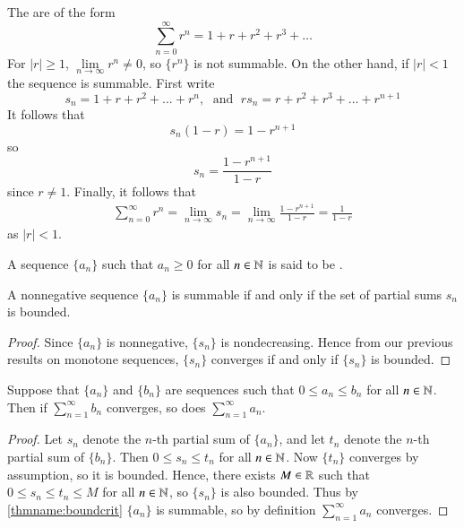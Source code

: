 \documentclass[12pt, a4paper, oneside, openright, titlepage]{book}
\begin{document}
\begin{eg}
    The  are of the form \begin{equation*}
        \sum\limits_{n=0}^{\infty}r^n = 1+r+r^2+r^3+\hdots
    \end{equation*}
    For $|r| \geq 1$, $\lim\limits_{n\rightarrow \infty}r^n \neq 0$, so $\{r^n\}$ is not summable. On the other hand, if $|r| < 1$ the sequence is summable. First write $$s_n = 1+r+r^2+...+r^n,\;\text{ and }\;rs_n = r+r^2+r^3+...+r^{n+1}$$
    It follows that $$s_n(1-r) = 1 - r^{n+1}$$ so $$s_n = \frac{1-r^{n+1}}{1-r}$$ since $r \neq 1$. Finally, it follows that \begin{align*}
        \sum\limits_{n=0}^{\infty}r^n = \lim\limits_{n\rightarrow \infty}s_n = \lim\limits_{n\rightarrow \infty}\frac{1-r^{n+1}}{1-r} = \frac{1}{1-r}
    \end{align*}
    as $|r| < 1$.
\end{eg}

\begin{defn}
    A sequence $\{a_n\}$ such that $a_n\geq 0$ for all $n \in \mathbb N$ is said to be .
\end{defn}

\begin{namthm}\label{thmname:boundcrit}
    A nonnegative sequence $\{a_n\}$ is summable if and only if the set of partial sums $s_n$ is bounded.
\end{namthm}
\begin{proof}
    Since $\{a_n\}$ is nonnegative, $\{s_n\}$ is nondecreasing. Hence from our previous results on monotone sequences, $\{s_n\}$ converges if and only if $\{s_n\}$ is bounded.
\end{proof}


\begin{namthm}\label{thmname:comptest}
    Suppose that $\{a_n\}$ and $\{b_n\}$ are sequences such that $0 \leq a_n \leq b_n$ for all $n \in \mathbb N$. Then if $\sum\limits_{n=1}^{\infty}b_n$ converges, so does $\sum\limits_{n=1}^{\infty}a_n$.
\end{namthm}
\begin{proof}
    Let $s_n$ denote the $n$-th partial sum of $\{a_n\}$, and let $t_n$ denote the $n$-th partial sum of $\{b_n\}$. Then $0 \leq s_n \leq t_n$ for all $n \in \mathbb N$. Now $\{t_n\}$ converges by assumption, so it is bounded. Hence, there exists $M \in \mathbb R$ such that $0 \leq s_n \leq t_n \leq M$ for all $n\in \mathbb N$, so $\{s_n\}$ is also bounded. Thus by \ref{thmname:boundcrit} $\{a_n\}$ is summable, so by definition $\sum\limits_{n=1}^{\infty}a_n$ converges.
\end{proof}
\end{document}
